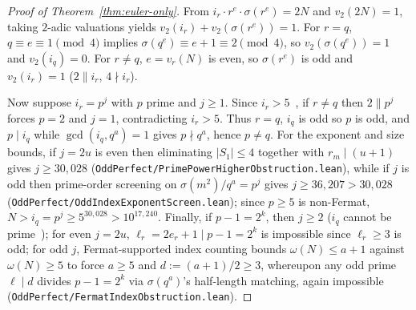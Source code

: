 \documentclass[11pt]{amsart}
\theoremstyle{definition}
\theoremstyle{remark}
\begin{document}
\begin{proof}[Proof of Theorem~\ref{thm:euler-only}]
From $i_r \cdot r^e \cdot \sigma(r^e) = 2N$ and $v_2(2N) = 1$, taking $2$-adic valuations yields $v_2(i_r) + v_2(\sigma(r^e)) = 1$. For $r = q$, $q \equiv e \equiv 1 \pmod 4$ implies $\sigma(q^e) \equiv e + 1 \equiv 2 \pmod 4$, so $v_2(\sigma(q^e)) = 1$ and $v_2(i_q) = 0$. For $r \ne q$, $e = v_r(N)$ is even, so $\sigma(r^e)$ is odd and $v_2(i_r) = 1$ ($2 \parallel i_r$, $4 \nmid i_r$).

Now suppose $i_r = p^j$ with $p$ prime and $j \ge 1$. Since $i_r > 5$~\cite{DrisLuca2016}, if $r \ne q$ then $2 \parallel p^j$ forces $p = 2$ and $j = 1$, contradicting $i_r > 5$. Thus $r = q$, $i_q$ is odd so $p$ is odd, and $p \mid i_q$ while $\gcd(i_q, q^a) = 1$ gives $p \nmid q^a$, hence $p \ne q$. For the exponent and size bounds, if $j = 2u$ is even then eliminating $|S_1| \le 4$ together with $r_m \mid (u + 1)$ gives $j \ge 30{,}028$ (\texttt{OddPerfect/PrimePowerHigherObstruction.lean}), while if $j$ is odd then prime-order screening on $\sigma(m^2)/q^a = p^j$ gives $j \ge 36{,}207 > 30{,}028$ (\texttt{OddPerfect/OddIndexExponentScreen.lean}); since $p \ge 5$ is non-Fermat, $N > i_q = p^j \ge 5^{30{,}028} > 10^{17{,}240}$. Finally, if $p - 1 = 2^k$, then $j \ge 2$ ($i_q$ cannot be prime~\cite{ChenChen2014}); for even $j = 2u$, $\ell_r = 2 e_r + 1 \mid p - 1 = 2^k$ is impossible since $\ell_r \ge 3$ is odd; for odd $j$, Fermat-supported index counting bounds $\omega(N) \le a + 1$ against $\omega(N) \ge 5$ to force $a \ge 5$ and $d := (a + 1)/2 \ge 3$, whereupon any odd prime $\ell \mid d$ divides $p - 1 = 2^k$ via $\sigma(q^a)$'s half-length matching, again impossible (\texttt{OddPerfect/FermatIndexObstruction.lean}).
\end{proof}
\end{document}
